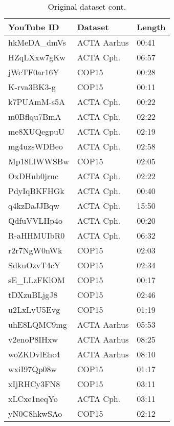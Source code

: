 \begin{table}[!ht]
	\begin{center}
	\caption{Original dataset cont.}
	\label{tab:orgdataset2}
		\begin{tabular}{lll}
		\toprule
			YouTube ID & Dataset & Length \\
			\midrule
			hkMeDA\_dmVs & ACTA Aarhus & 00:41 \\
			HZqLXxw7gKw & ACTA Cph. & 06:57 \\
			jWcTF0ar16Y & COP15 & 00:28 \\
			K-rva3BK3-g & COP15 & 00:11 \\
			k7PUAmM-s5A & ACTA Cph. & 00:22 \\
			m0Bflqu7BmA & ACTA Cph. & 02:22 \\
			me8XUQegpuU & ACTA Cph. & 02:19 \\
			mg4uzsWDBeo & ACTA Cph. & 02:58 \\
			Mp18LlWWSBw & COP15 & 02:05 \\
			OxDHuh0jrnc & ACTA Cph. & 02:22 \\
			PdyIqBKFHGk & ACTA Cph. & 00:40 \\
			q4kzDaJJBqw & ACTA Cph. & 15:50 \\
			QdfuVVLHp4o & ACTA Cph. & 00:20 \\
			R-aHHMUIbR0 & ACTA Cph. & 06:32 \\
			r2r7NgW0nWk & COP15 & 02:03 \\
			SdkuOzvT4cY & COP15 & 02:34 \\
			sE\_LLzFKlOM & COP15 & 00:17 \\
			tDXzuBLjgJ8 & COP15 & 02:46 \\
			u2LxLvU5Evg & COP15 & 01:19 \\
			uhE8LQMC9mg & ACTA Aarhus & 05:53 \\
			v2enoP8IHxw & ACTA Aarhus & 08:25 \\
			woZKDvlEhc4 & ACTA Aarhus & 08:10 \\
			wxiI97Qp08w & COP15 & 01:17 \\
			xIjRHCy3FN8 & COP15 & 03:11 \\
			xLCxe1neqYo & ACTA Cph. & 03:11 \\
			yN0C8hkwSAo & COP15 & 02:12 \\
		\bottomrule
		\end{tabular}
	\end{center}
\end{table}
%